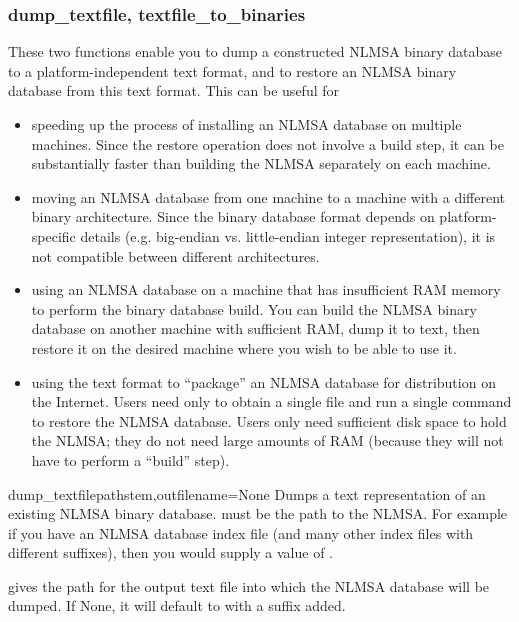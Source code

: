 \documentclass{howto}
\begin{document}
\subsubsection{dump_textfile, textfile_to_binaries}
These two functions enable you to dump a constructed NLMSA binary database
to a platform-independent text format, and to restore an NLMSA binary database
from this text format.  This can be useful for 
\begin{itemize}
\item speeding up the process of installing an NLMSA database on multiple
machines.  Since the restore operation does not involve a build step, it 
can be substantially faster than building the NLMSA separately on each machine.

\item moving an NLMSA database from one machine to a machine with a different
binary architecture.  Since the binary database format depends on platform-specific
details (e.g. big-endian vs. little-endian integer representation), it is not
compatible between different architectures.

\item using an NLMSA database on a machine that has insufficient RAM memory
to perform the binary database build.  You can build the NLMSA binary database
on another machine with sufficient RAM, dump it to text, then restore it on
the desired machine where you wish to be able to use it.

\item using the text format to ``package'' an NLMSA database for distribution
on the Internet.  Users need only to obtain a single file and run a single command
to restore the NLMSA database.  Users only need sufficient disk space to hold
the NLMSA; they do not need large amounts of RAM (because they will not have to
perform a ``build'' step).

\end{itemize}

\begin{funcdesc}{dump_textfile}{pathstem,outfilename=None}
  Dumps a text representation of an existing NLMSA binary database.
   must be the path to the NLMSA.  For
  example if you have an NLMSA database index file 
  (and many other index files with different suffixes),
  then you would supply a  value of .

   gives the path for the output text file into which the
  NLMSA database will be dumped.  If None, it will default to  with a
   suffix added.
\end{funcdesc}
\end{document}
